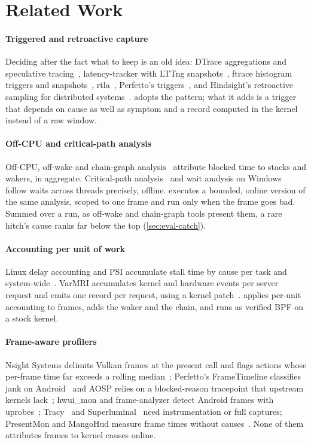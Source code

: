 \section{Related Work}
\label{sec:related}

\paragraph{Triggered and retroactive capture} Deciding after the fact what to
keep is an old idea: DTrace aggregations and speculative
tracing~\cite{cantrill2004dtrace}, latency-tracker with LTTng
snapshots~\cite{desfossez2016latency,lttng}, ftrace histogram triggers and
snapshots~\cite{ftracehist}, rtla~\cite{rtla}, Perfetto's
triggers~\cite{perfetto-triggers}, and Hindsight's retroactive sampling for
distributed systems~\cite{zhang2023hindsight}. \sys adopts the pattern; what
it adds is a trigger that depends on cause as well as symptom and a record
computed in the kernel instead of a raw window.

\paragraph{Off-CPU and critical-path analysis} Off-CPU, off-wake and chain-graph
analysis~\cite{gregg-offcpu,gregg-chaingraph,gregg2019bpf} attribute blocked
time to stacks and wakers, in aggregate. Critical-path
analysis~\cite{giraldeau2016wait,zhou2018wperf,perfetto-critpath} and wait
analysis on Windows~\cite{ets-wait-analysis} follow waits across threads
precisely, offline. \sys executes a bounded, online version of the same
analysis, scoped to one frame and run only when the frame goes bad. Summed
over a run, as off-wake and chain-graph tools present them, a rare hitch's
cause ranks far below the top (\autoref{sec:eval-catch}).

\paragraph{Accounting per unit of work} Linux delay accounting and PSI
accumulate stall time by cause per task and system-wide~\cite{delayacct,psi}.
VarMRI accumulates kernel and hardware events per server request and emits
one record per request, using a kernel patch~\cite{varmri}. \sys applies
per-unit accounting to frames, adds the waker and the chain, and runs as
verified BPF on a stock kernel.

\paragraph{Frame-aware profilers} Nsight Systems delimits Vulkan frames at the
present call and flags actions whose per-frame time far exceeds a rolling
median~\cite{nsight}; Perfetto's FrameTimeline classifies jank on
Android~\cite{perfetto-frametimeline} and AOSP relies on a blocked-reason
tracepoint that upstream kernels lack~\cite{aosp-blocked-reason}; hwui\_mon
and frame-analyzer detect Android frames with
uprobes~\cite{hwui-mon,frame-analyzer}; Tracy~\cite{tracy} and
Superluminal~\cite{superluminal} need instrumentation or full captures;
PresentMon and MangoHud measure frame times without
causes~\cite{presentmon,mangohud}. None of them attributes frames to kernel
causes online.

